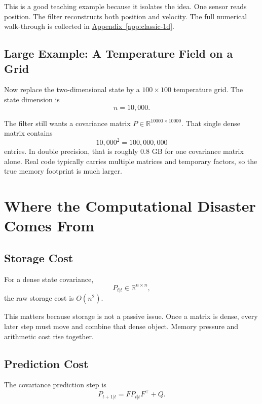 \documentclass[12pt,a4paper]{article}
\begin{document}
This is a good teaching example because it isolates the idea. One sensor reads position. The filter reconstructs both position and velocity. The full numerical walk-through is collected in \hyperref[app:classic-1d]{Appendix~\ref*{app:classic-1d}}.

\subsection{Large Example: A Temperature Field on a Grid}

Now replace the two-dimensional state by a \(100 \times 100\) temperature grid. The state dimension is
\[
n = 10{,}000.
\]

The filter still wants a covariance matrix \(P \in \mathbb{R}^{10000 \times 10000}\). That single dense matrix contains
\[
10{,}000^2 = 100{,}000{,}000
\]
entries. In double precision, that is roughly \(0.8\) GB for one covariance matrix alone. Real code typically carries multiple matrices and temporary factors, so the true memory footprint is much larger.


\section{Where the Computational Disaster Comes From}

\subsection{Storage Cost}

For a dense state covariance,
\[
P_{t|t} \in \mathbb{R}^{n \times n},
\]
the raw storage cost is \(O(n^2)\).

This matters because storage is not a passive issue. Once a matrix is dense, every later step must move and combine that dense object. Memory pressure and arithmetic cost rise together.

\subsection{Prediction Cost}

The covariance prediction step is
\[
P_{t+1|t} = F P_{t|t} F^\top + Q.
\]
\end{document}
